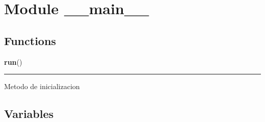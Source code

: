 %
%
%


\section{Module \_\_main\_\_}

    \label{__main__}


  \subsection{Functions}

    \label{__main__:run}

    \vspace{0.5ex}

\hspace{.8\funcindent}\begin{boxedminipage}{\funcwidth}

    \raggedright \textbf{run}()

    \vspace{-1.5ex}

    \rule{\textwidth}{0.5\fboxrule}
\setlength{\parskip}{2ex}
    Metodo de inicializacion

\setlength{\parskip}{1ex}
    \end{boxedminipage}



  \subsection{Variables}

